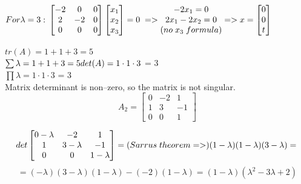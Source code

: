 \documentclass[eng,openany]{mgr}
\begin{document}
\begin{math}
For \lambda = 3:\\
\begin{bmatrix}
-2 & 0 & 0  \\
2 & -2 & 0 \\
0 & 0 & 0 
\end{bmatrix}
\begin{bmatrix}
x_1 \\
x_2 \\
x_3
\end{bmatrix}
= 0\; =>
\begin{matrix}
-2x_1 = 0\\
2x_1 -2x_2 = 0\\
(no\;x_3\;formula)
\end{matrix}
=>
x = 
\begin{bmatrix}
0\\
0 \\
t
\end{bmatrix}
\end{math}
\\ \\ 
$tr(A) = 1 + 1 + 3 = 5$\\
$\sum \lambda = 1 + 1 + 3 = 5
\\ \\
det(A) = 1 \cdot 1 \cdot 3$ = 3\\
$\prod \lambda = 1 \cdot 1 \cdot 3$ = 3
\\
Matrix determinant is non--zero, so the matrix is not singular.
\newpage
\[
A_2 =
\begin{bmatrix}
	0 & -2 & 1  \\
	1 & 3 & -1 \\
	0 & 0 & 1 
\end{bmatrix}
\]

\[
det
\begin{bmatrix}
0-\lambda & -2 & 1  \\
1 & 3-\lambda & -1 \\
0 & 0 & 1-\lambda 
\end{bmatrix}
= (Sarrus\;theorem =>)(1-\lambda)(1-\lambda)(3-\lambda) = \\ 
\]
\[
= (-\lambda)(3-\lambda)(1-\lambda) - (-2)(1-\lambda) = (1-\lambda)(\lambda ^2 - 3\lambda + 2)
\]
\end{document}
